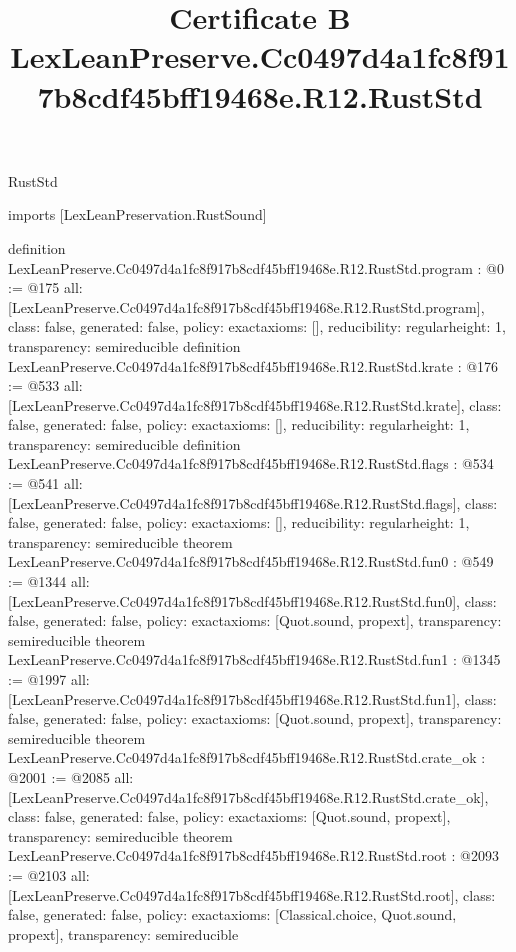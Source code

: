 \begin{lexlean}{RustStd}
\title{Certificate B LexLeanPreserve.Cc0497d4a1fc8f917b8cdf45bff19468e.R12.RustStd}
\begin{coremodule}
imports [LexLeanPreservation.RustSound]

definition LexLeanPreserve.Cc0497d4a1fc8f917b8cdf45bff19468e.R12.RustStd.program : @0 := @175 {
  all: [LexLeanPreserve.Cc0497d4a1fc8f917b8cdf45bff19468e.R12.RustStd.program],
  class: false,
  generated: false,
  policy: exact{axioms: []},
  reducibility: regular{height: 1},
  transparency: semireducible
}
definition LexLeanPreserve.Cc0497d4a1fc8f917b8cdf45bff19468e.R12.RustStd.krate : @176 := @533 {
  all: [LexLeanPreserve.Cc0497d4a1fc8f917b8cdf45bff19468e.R12.RustStd.krate],
  class: false,
  generated: false,
  policy: exact{axioms: []},
  reducibility: regular{height: 1},
  transparency: semireducible
}
definition LexLeanPreserve.Cc0497d4a1fc8f917b8cdf45bff19468e.R12.RustStd.flags : @534 := @541 {
  all: [LexLeanPreserve.Cc0497d4a1fc8f917b8cdf45bff19468e.R12.RustStd.flags],
  class: false,
  generated: false,
  policy: exact{axioms: []},
  reducibility: regular{height: 1},
  transparency: semireducible
}
theorem LexLeanPreserve.Cc0497d4a1fc8f917b8cdf45bff19468e.R12.RustStd.fun0 : @549 := @1344 {
  all: [LexLeanPreserve.Cc0497d4a1fc8f917b8cdf45bff19468e.R12.RustStd.fun0],
  class: false,
  generated: false,
  policy: exact{axioms: [Quot.sound, propext]},
  transparency: semireducible
}
theorem LexLeanPreserve.Cc0497d4a1fc8f917b8cdf45bff19468e.R12.RustStd.fun1 : @1345 := @1997 {
  all: [LexLeanPreserve.Cc0497d4a1fc8f917b8cdf45bff19468e.R12.RustStd.fun1],
  class: false,
  generated: false,
  policy: exact{axioms: [Quot.sound, propext]},
  transparency: semireducible
}
theorem LexLeanPreserve.Cc0497d4a1fc8f917b8cdf45bff19468e.R12.RustStd.crate_ok : @2001 := @2085 {
  all: [LexLeanPreserve.Cc0497d4a1fc8f917b8cdf45bff19468e.R12.RustStd.crate_ok],
  class: false,
  generated: false,
  policy: exact{axioms: [Quot.sound, propext]},
  transparency: semireducible
}
theorem LexLeanPreserve.Cc0497d4a1fc8f917b8cdf45bff19468e.R12.RustStd.root : @2093 := @2103 {
  all: [LexLeanPreserve.Cc0497d4a1fc8f917b8cdf45bff19468e.R12.RustStd.root],
  class: false,
  generated: false,
  policy: exact{axioms: [Classical.choice, Quot.sound, propext]},
  transparency: semireducible
}


\end{coremodule}
\end{lexlean}
